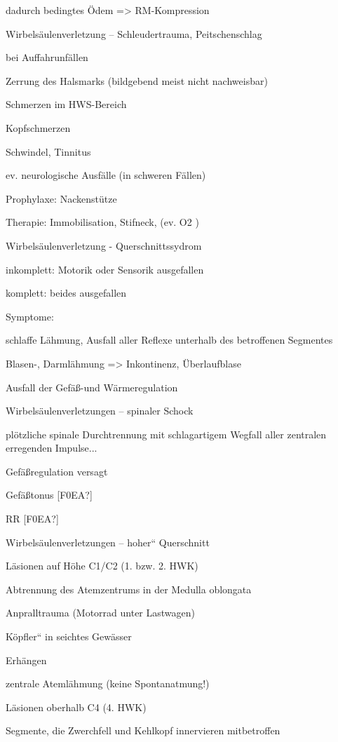 \documentclass{article}
\begin{document}
dadurch bedingtes \"Odem ={\textgreater} RM-Kompression

Wirbels\"aulenverletzung -- Schleudertrauma, Peitschenschlag

bei Auffahrunf\"allen

Zerrung des Halsmarks (bildgebend meist nicht nachweisbar)

Schmerzen im HWS-Bereich

Kopfschmerzen

Schwindel, Tinnitus

ev. neurologische Ausf\"alle (in schweren F\"allen)

Prophylaxe: Nackenst\"utze

Therapie: Immobilisation, Stifneck, (ev. O2 )

Wirbels\"aulenverletzung -  Querschnittssydrom

inkomplett: Motorik oder Sensorik  ausgefallen

komplett: beides ausgefallen

Symptome:

schlaffe L\"ahmung, Ausfall aller Reflexe  unterhalb des betroffenen
Segmentes

Blasen-, Darml\"ahmung ={\textgreater} Inkontinenz,  \"Uberlaufblase

Ausfall der Gef\"a{\ss}-und W\"armeregulation

Wirbels\"aulenverletzungen -- spinaler  Schock

pl\"otzliche spinale Durchtrennung mit  schlagartigem Wegfall aller
zentralen  erregenden Impulse...

Gef\"a{\ss}regulation versagt

Gef\"a{\ss}tonus [F0EA?]

RR [F0EA?]  

Wirbels\"aulenverletzungen -- {\quotedblbase}hoher{\textquotedblleft} 
Querschnitt

L\"asionen auf H\"ohe C1/C2 (1. bzw. 2.  HWK)

Abtrennung des Atemzentrums in der Medulla  oblongata

Anpralltrauma (Motorrad unter Lastwagen)

{\quotedblbase}K\"opfler{\textquotedblleft} in seichtes Gew\"asser

Erh\"angen

zentrale Ateml\"ahmung (keine  Spontanatmung!)

L\"asionen oberhalb C4 (4. HWK)

Segmente, die Zwerchfell und Kehlkopf  innervieren mitbetroffen
\end{document}
